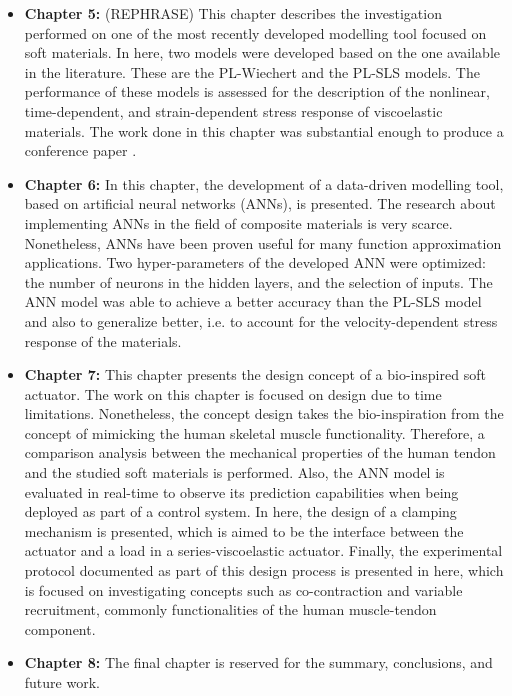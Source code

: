\begin{itemize}
    \item {\bf Chapter 5: } (REPHRASE) This chapter describes the investigation performed on one of the most recently developed modelling tool focused on soft materials. In here, two models were developed based on the one available in the literature. These are the PL-Wiechert and the PL-SLS models. The performance of these models is assessed for the description of the nonlinear, time-dependent, and strain-dependent stress response of viscoelastic materials. The work done in this chapter was substantial enough to produce a conference paper \cite{solis2018assessment}.
    \item {\bf Chapter 6: } In this chapter, the development of a data-driven modelling tool, based on artificial neural networks (ANNs), is presented. The research about implementing ANNs in the field of composite materials is very scarce. Nonetheless, ANNs have been proven useful for many function approximation applications. Two hyper-parameters of the developed ANN were optimized: the number of neurons in the hidden layers, and the selection of inputs. The ANN model was able to achieve a better accuracy than the PL-SLS model and also to generalize better, i.e. to account for the velocity-dependent stress response of the materials.
    \item {\bf Chapter 7: } This chapter presents the design concept of a bio-inspired soft actuator. The work on this chapter is focused on design due to time limitations. Nonetheless, the concept design takes the bio-inspiration from the concept of mimicking the human skeletal muscle functionality. Therefore, a comparison analysis between the mechanical properties of the human tendon and the studied soft materials is performed. Also, the ANN model is evaluated in real-time to observe its prediction capabilities when being deployed as part of a control system. In here, the design of a clamping mechanism is presented, which is aimed to be the interface between the actuator and a load in a series-viscoelastic actuator. Finally, the experimental protocol documented as part of this design process is presented in here, which is focused on investigating concepts such as co-contraction and variable recruitment, commonly functionalities of the human muscle-tendon component.
    \item {\bf Chapter 8: } The final chapter is reserved for the summary, conclusions, and future work.
\end{itemize}